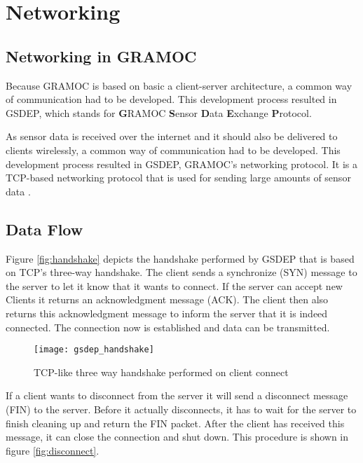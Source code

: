 \chapter{Networking}
\label{ch:networking}

\author{Nico Kratky}
%
\section{Networking in GRAMOC}

Because GRAMOC is based on basic a client-server architecture, a common way of communication had to be developed. This development process resulted in GSDEP, which stands for \textbf{G}RAMOC \textbf{S}ensor \textbf{D}ata \textbf{E}xchange \textbf{P}rotocol.

As sensor data is received over the internet and it should also be delivered to clients wirelessly, a common way of communication had to be developed. This development process resulted in GSDEP, GRAMOC's networking protocol. It is a TCP-based networking protocol that is used for sending large amounts of sensor data \autocite{rfc793}.

\section{Data Flow}
\label{sec:networking_data-flow}

Figure \vref{fig:handshake} depicts the handshake performed by GSDEP that is based on TCP's three-way handshake. The client sends a synchronize (SYN) message to the server to let it know that it wants to connect. If the server can accept new Clients it returns an acknowledgment message (ACK). The client then also returns this acknowledgment message to inform the server that it is indeed connected. The connection now is established and data can be transmitted.

\begin{figure}[h]
    \centering
    \texttt{[image: gsdep\_handshake]}
    \caption{TCP-like three way handshake performed on client connect}
    \label{fig:handshake}
\end{figure}

If a client wants to disconnect from the server it will send a disconnect message (FIN) to the server. Before it actually disconnects, it has to wait for the server to finish cleaning up and return the FIN packet. After the client has received this message, it can close the connection and shut down. This procedure is shown in figure \vref{fig:disconnect}.

